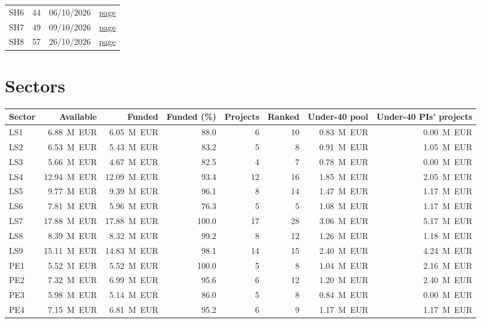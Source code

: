 \documentclass[11pt,a4paper]{article}
\begin{document}
\begin{table}[H]
\begin{tabular}{llll}
SH6 & 44 & 06/10/2026 & \href{https://www.mur.gov.it/it/atti-e-normativa/bando-prin-2026-ddg-6-ottobre-2026-n-44-macrosettore-sh-settore-sh6-approvazione}{page} \\
SH7 & 49 & 09/10/2026 & \href{https://www.mur.gov.it/it/atti-e-normativa/decreto-direttoriale-n-49-del-09-10-2026}{page} \\
SH8 & 57 & 26/10/2026 & \href{https://www.mur.gov.it/it/atti-e-normativa/decreto-direttoriale-n-57-del-26-10-2026}{page} \\
\bottomrule
\end{tabular}
\end{table}
\section{Sectors}
\begin{table}[H]
\centering
\footnotesize\setlength{\tabcolsep}{3pt}
\begin{tabular}{lrrrrrrr}
\toprule
Sector & Available & Funded & Funded (\%) & Projects & Ranked & Under-40 pool & Under-40 PIs' projects \\
\midrule
LS1 & 6.88~M~EUR & 6.05~M~EUR & 88.0 & 6 & 10 & 0.83~M~EUR & 0.00~M~EUR \\
LS2 & 6.53~M~EUR & 5.43~M~EUR & 83.2 & 5 & 8 & 0.91~M~EUR & 1.05~M~EUR \\
LS3 & 5.66~M~EUR & 4.67~M~EUR & 82.5 & 4 & 7 & 0.78~M~EUR & 0.00~M~EUR \\
LS4 & 12.94~M~EUR & 12.09~M~EUR & 93.4 & 12 & 16 & 1.85~M~EUR & 2.05~M~EUR \\
LS5 & 9.77~M~EUR & 9.39~M~EUR & 96.1 & 8 & 14 & 1.47~M~EUR & 1.17~M~EUR \\
LS6 & 7.81~M~EUR & 5.96~M~EUR & 76.3 & 5 & 5 & 1.08~M~EUR & 1.17~M~EUR \\
LS7 & 17.88~M~EUR & 17.88~M~EUR & 100.0 & 17 & 28 & 3.06~M~EUR & 5.17~M~EUR \\
LS8 & 8.39~M~EUR & 8.32~M~EUR & 99.2 & 8 & 12 & 1.26~M~EUR & 1.18~M~EUR \\
LS9 & 15.11~M~EUR & 14.83~M~EUR & 98.1 & 14 & 15 & 2.40~M~EUR & 4.24~M~EUR \\
PE1 & 5.52~M~EUR & 5.52~M~EUR & 100.0 & 5 & 8 & 1.04~M~EUR & 2.16~M~EUR \\
PE2 & 7.32~M~EUR & 6.99~M~EUR & 95.6 & 6 & 12 & 1.20~M~EUR & 2.40~M~EUR \\
PE3 & 5.98~M~EUR & 5.14~M~EUR & 86.0 & 5 & 8 & 0.84~M~EUR & 0.00~M~EUR \\
PE4 & 7.15~M~EUR & 6.81~M~EUR & 95.2 & 6 & 9 & 1.17~M~EUR & 1.17~M~EUR \\

\end{tabular}
\end{table}
\end{document}
